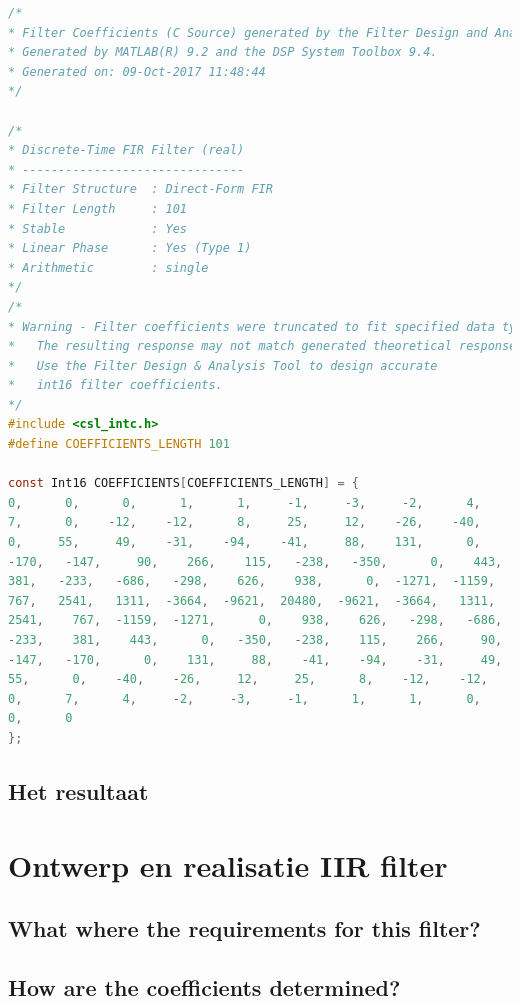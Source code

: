 \documentclass[11pt,a4paper]{article}
\begin{document}
	\begin{lstlisting}[language=c]
/*
* Filter Coefficients (C Source) generated by the Filter Design and Analysis Tool
* Generated by MATLAB(R) 9.2 and the DSP System Toolbox 9.4.
* Generated on: 09-Oct-2017 11:48:44
*/

/*
* Discrete-Time FIR Filter (real)
* -------------------------------
* Filter Structure  : Direct-Form FIR
* Filter Length     : 101
* Stable            : Yes
* Linear Phase      : Yes (Type 1)
* Arithmetic        : single
*/
/*
* Warning - Filter coefficients were truncated to fit specified data type.  
*   The resulting response may not match generated theoretical response.
*   Use the Filter Design & Analysis Tool to design accurate
*   int16 filter coefficients.
*/
#include <csl_intc.h>
#define COEFFICIENTS_LENGTH 101

const Int16 COEFFICIENTS[COEFFICIENTS_LENGTH] = {
0,      0,      0,      1,      1,     -1,     -3,     -2,      4,
7,      0,    -12,    -12,      8,     25,     12,    -26,    -40,
0,     55,     49,    -31,    -94,    -41,     88,    131,      0,
-170,   -147,     90,    266,    115,   -238,   -350,      0,    443,
381,   -233,   -686,   -298,    626,    938,      0,  -1271,  -1159,
767,   2541,   1311,  -3664,  -9621,  20480,  -9621,  -3664,   1311,
2541,    767,  -1159,  -1271,      0,    938,    626,   -298,   -686,
-233,    381,    443,      0,   -350,   -238,    115,    266,     90,
-147,   -170,      0,    131,     88,    -41,    -94,    -31,     49,
55,      0,    -40,    -26,     12,     25,      8,    -12,    -12,
0,      7,      4,     -2,     -3,     -1,      1,      1,      0,
0,      0
};
	\end{lstlisting}
	\clearpage


	\subsection{Het resultaat}
	\clearpage
	
	\section{Ontwerp en realisatie IIR filter}
	\subsection{What where the requirements for this filter?}
	
	\subsection{How are the coefficients determined?}
	
\end{document}
